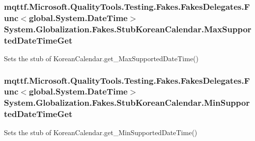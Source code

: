 \hypertarget{class_system_1_1_globalization_1_1_fakes_1_1_stub_korean_calendar_ac825517526e9acc0ff2c16409faa023d}{
\subsubsection[{Max\-Supported\-Date\-Time\-Get}]{\setlength{\rightskip}{0pt plus 5cm}mqttf.\-Microsoft.\-Quality\-Tools.\-Testing.\-Fakes.\-Fakes\-Delegates.\-Func$<$global.\-System.\-Date\-Time$>$ System.\-Globalization.\-Fakes.\-Stub\-Korean\-Calendar.\-Max\-Supported\-Date\-Time\-Get}}\label{class_system_1_1_globalization_1_1_fakes_1_1_stub_korean_calendar_ac825517526e9acc0ff2c16409faa023d}


Sets the stub of Korean\-Calendar.\-get\-\_\-\-Max\-Supported\-Date\-Time()

\hypertarget{class_system_1_1_globalization_1_1_fakes_1_1_stub_korean_calendar_a45bf52fbc8fe045c2ea62e2432681c7d}{
\subsubsection[{Min\-Supported\-Date\-Time\-Get}]{\setlength{\rightskip}{0pt plus 5cm}mqttf.\-Microsoft.\-Quality\-Tools.\-Testing.\-Fakes.\-Fakes\-Delegates.\-Func$<$global.\-System.\-Date\-Time$>$ System.\-Globalization.\-Fakes.\-Stub\-Korean\-Calendar.\-Min\-Supported\-Date\-Time\-Get}}\label{class_system_1_1_globalization_1_1_fakes_1_1_stub_korean_calendar_a45bf52fbc8fe045c2ea62e2432681c7d}


Sets the stub of Korean\-Calendar.\-get\-\_\-\-Min\-Supported\-Date\-Time()

